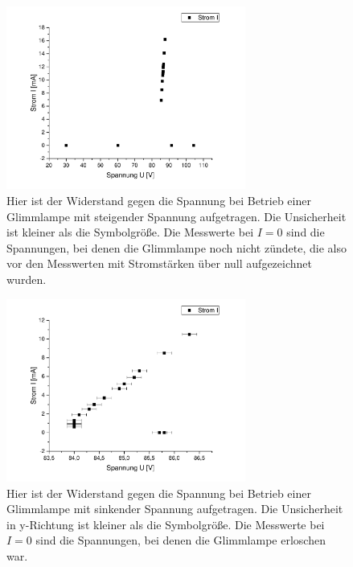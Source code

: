 \documentclass[
	a4paper,
	12pt,
	pagesize,
	ngerman
]{scrartcl}
\begin{document}
	\begin{figure}[H]
		\includegraphics[width=0.7\textwidth]{glimm_steig}
		\centering
		\caption{Hier ist der Widerstand gegen die Spannung bei Betrieb einer Glimmlampe mit steigender Spannung aufgetragen. Die Unsicherheit ist kleiner als die Symbolgröße. Die Messwerte bei $I=0$ sind die Spannungen, bei denen die Glimmlampe noch nicht zündete, die also vor den Messwerten mit Stromstärken über null aufgezeichnet wurden.}
		\label{glimm_steig}
		\centering
	\end{figure}
	\begin{figure}[H]
		\includegraphics[width=0.7\textwidth]{glimm_fall}
		\centering
		\caption{Hier ist der Widerstand gegen die Spannung bei Betrieb einer Glimmlampe mit sinkender Spannung aufgetragen. Die Unsicherheit in y-Richtung ist kleiner als die Symbolgröße. Die Messwerte bei $I=0$ sind die Spannungen, bei denen die Glimmlampe erloschen war.}
		\label{glimm_fall}
		\centering
	\end{figure}
\end{document}
